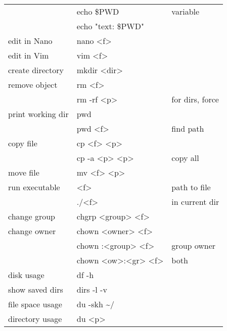 {\begin{tabularx}{\linewidth}{@{} l>{\ttfamily}lX @{}}
                         & echo \$PWD                 & variable        \\
                         & echo "text: \$PWD"         &                 \\
    edit in Nano         & nano <f>                   &                 \\
    edit in Vim          & vim <f>                    &                 \\
    create directory     & mkdir <dir>                &                 \\
    remove object        & rm <f>                     &                 \\
                         & rm -rf <p>                 & for dirs, force \\
    print working dir    & pwd                        &                 \\
                         & pwd <f>                    & find path       \\
    copy file            & cp <f> <p>                 &                 \\
                         & cp -a <p> <p>              & copy all        \\
    move file            & mv <f> <p>                 &                 \\
    run executable       & <f>                        & path to file    \\
                         & ./<f>                      & in current dir  \\
    change group         & chgrp <group> <f>          &                 \\
    change owner         & chown <owner> <f>          &                 \\
                         & chown :<group> <f>         & group owner     \\
                         & chown <ow>:<gr> <f>        & both            \\
    disk usage           & df -h                      &                 \\
    show saved dirs      & dirs -l -v                 &                 \\
    file space usage     & du -skh \textasciitilde{}/ &                 \\
    directory usage      & du <p>                     &                 \\
\end{tabularx}
\begin{tabularx}{\linewidth}{@{} l>{\ttfamily}lX @{}}

\end{tabularx}}
